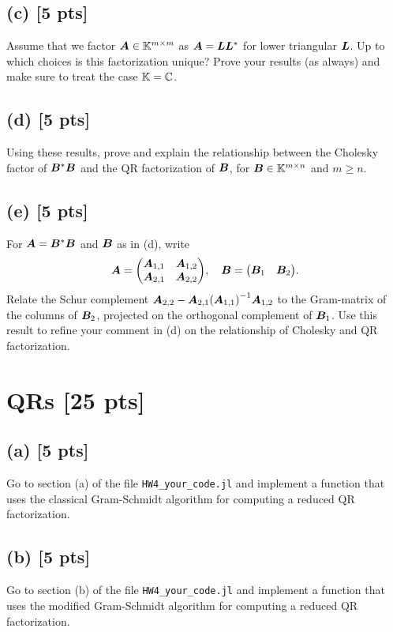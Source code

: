 \documentclass[twoside,10pt]{article}
\begin{document}
\subsection*{(c) [5 pts]}
Assume that we factor $\bm{A} \in \mathbb{K}^{m \times m}$ as $\bm{A} = \bm{L} \bm{L}^{*}$ for lower triangular $\bm{L}$.  
Up to which choices is this factorization unique? 
Prove your results (as always) and make sure to treat the case $\mathbb{K} = \mathbb{C}$. 

\subsection*{(d) [5 pts]} 
Using these results, prove and explain the relationship between the Cholesky factor of $\bm{B}^* \bm{B}$ and the QR factorization of $\bm{B}$, for $\bm{B} \in \mathbb{K}^{m \times n}$ and $m \geq n$.

\subsection*{(e) [5 pts]} 
For $\bm{A} = \bm{B}^* \bm{B}$ and $\bm{B}$ as in (d), write 
\begin{equation}
\mtx{A} = 
\begin{pmatrix}
 \mtx{A}_{1,1}& \mtx{A}_{1,2} \\
 \mtx{A}_{2,1}& \mtx{A}_{2,2} 
\end{pmatrix}, 
\quad 
\mtx{B} = 
\begin{pmatrix}
 \mtx{B}_{1} &  \mtx{B}_{2} 
\end{pmatrix}. 
\end{equation}
Relate the Schur complement $\mtx{A}_{2,2} - \mtx{A}_{2,1} \left(\mtx{A}_{1, 1}\right)^{-1} \mtx{A}_{1,2}$ to the Gram-matrix of the columns of $\bm{B}_2$, projected on the orthogonal complement of $\bm{B}_1$.
Use this result to refine your comment in (d) on the relationship of Cholesky and QR factorization. 

\section{QRs [25 pts]}
\subsection*{(a) [5 pts]} 
Go to section (a) of the file \texttt{HW4\_your\_code.jl} and implement a function that uses the classical Gram-Schmidt algorithm for computing a reduced QR factorization. 

\subsection*{(b) [5 pts]} 
Go to section (b) of the file \texttt{HW4\_your\_code.jl} and implement a function that uses the modified Gram-Schmidt algorithm for computing a reduced QR factorization. 
\end{document}
